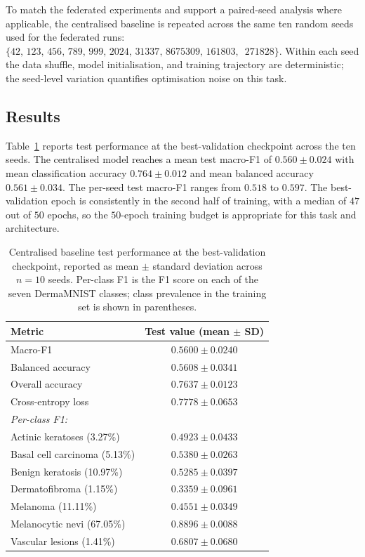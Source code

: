 To match the federated experiments and support a paired-seed
analysis where applicable, the centralised baseline is repeated
across the same ten random seeds used for the federated runs:
$\{42,\,123,\,456,\,789,\,999,\,2024,\,31337,\,8675309,\,161803,\,$
$271828\}$. Within each seed the data shuffle, model initialisation,
and training trajectory are deterministic; the seed-level variation
quantifies optimisation noise on this task.

\subsection{Results}
\label{sec:centralised-results}

Table~\ref{tab:centralised-results} reports test performance at the
best-validation checkpoint across the ten seeds. The centralised
model reaches a mean test macro-F1 of $0.560\pm0.024$ with mean
classification accuracy $0.764\pm0.012$ and mean balanced accuracy
$0.561\pm0.034$. The per-seed test macro-F1 ranges from $0.518$ to
$0.597$. The best-validation epoch is consistently in the second
half of training, with a median of $47$ out of $50$ epochs, so the
$50$-epoch training budget is appropriate for this task and
architecture.

\begin{table}[!htbp]
\centering
\caption{Centralised baseline test performance at the
best-validation checkpoint, reported as mean $\pm$ standard
deviation across $n=10$ seeds. Per-class F1 is the F1 score on
each of the seven DermaMNIST classes; class prevalence in the
training set is shown in parentheses.}
\label{tab:centralised-results}
\small
\begin{tabular}{lc}
\toprule
Metric & Test value (mean $\pm$ SD) \\
\midrule
Macro-F1                        & $\mathbf{0.5600 \pm 0.0240}$ \\
Balanced accuracy               & $0.5608 \pm 0.0341$ \\
Overall accuracy                & $0.7637 \pm 0.0123$ \\
Cross-entropy loss              & $0.7778 \pm 0.0653$ \\
\midrule
\multicolumn{2}{l}{\textit{Per-class F1:}} \\
\quad Actinic keratoses (3.27\%)              & $0.4923 \pm 0.0433$ \\
\quad Basal cell carcinoma (5.13\%)           & $0.5380 \pm 0.0263$ \\
\quad Benign keratosis (10.97\%)              & $0.5285 \pm 0.0397$ \\
\quad Dermatofibroma (1.15\%)                 & $0.3359 \pm 0.0961$ \\
\quad Melanoma (11.11\%)                      & $0.4551 \pm 0.0349$ \\
\quad Melanocytic nevi (67.05\%)              & $0.8896 \pm 0.0088$ \\
\quad Vascular lesions (1.41\%)               & $0.6807 \pm 0.0680$ \\
\bottomrule
\end{tabular}
\end{table}

